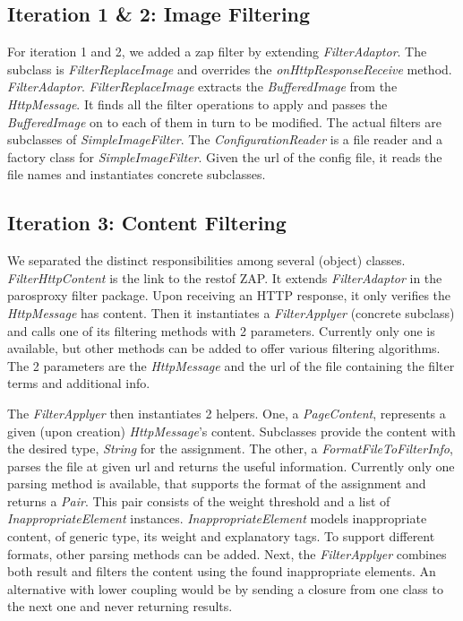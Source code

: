 \subsection{Iteration 1 \& 2: Image Filtering}
For iteration 1 and 2, we added a zap filter by extending \textit{FilterAdaptor}. The subclass is \textit{FilterReplaceImage} and overrides the \textit{onHttpResponseReceive} method. \textit{FilterAdaptor}. \textit{FilterReplaceImage} extracts the \textit{BufferedImage} from the \textit{HttpMessage}. It finds all the filter operations to apply and passes the \textit{BufferedImage} on to each of them in turn to be modified.
The actual filters are subclasses of \textit{SimpleImageFilter}. The \textit{ConfigurationReader} is a file reader and a factory class for \textit{SimpleImageFilter}. Given the url of the config file, it reads the file names and instantiates concrete subclasses.

\subsection{Iteration 3: Content Filtering}
We separated the distinct responsibilities among several (object) classes. \textit{FilterHttpContent} is the link to the restof ZAP. It extends \textit{FilterAdaptor} in the parosproxy filter package. Upon receiving an HTTP response, it only verifies the \textit{HttpMessage} has content. Then it instantiates a \textit{FilterApplyer} (concrete subclass) and calls one of its filtering methods with 2 parameters. Currently only one is available, but other methods can be added to offer various filtering algorithms. The 2 parameters are the \textit{HttpMessage} and the url of the file containing the filter terms and additional info.
\par
The \textit{FilterApplyer} then instantiates 2 helpers. One, a \textit{PageContent}, represents a given (upon creation) \textit{HttpMessage}'s content. Subclasses provide the content with the desired type, \textit{String} for the assignment. The other, a \textit{FormatFileToFilterInfo}, parses the file at given url and returns the useful information. Currently only one parsing method is available, that supports the format of the assignment and returns a \textit{Pair}. This pair consists of the weight threshold and a list of \textit{InappropriateElement} instances. \textit{InappropriateElement} models inappropriate content, of generic type, its weight and explanatory tags. To support different formats, other parsing methods can be added.
Next, the \textit{FilterApplyer} combines both result and filters the content using the found inappropriate elements.
An alternative with lower coupling would be by sending a closure from one class to the next one and never returning results.
